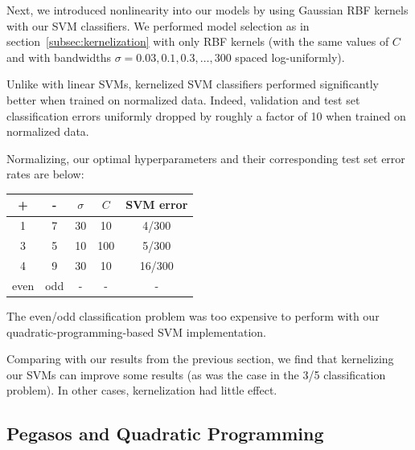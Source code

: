 \documentclass{article}
\begin{document}
\begin{multicols}{2}
Next, we introduced nonlinearity into our models
by using Gaussian RBF kernels with our SVM classifiers.
We performed model selection as in section~\ref{subsec:kernelization}
with only RBF kernels
(with the same values of $C$
and with bandwidths $\sigma = 0.03,0.1,0.3,\dots,300$ spaced log-uniformly).

Unlike with linear SVMs,
kernelized SVM classifiers performed significantly better
when trained on normalized data.
Indeed, validation and test set classification errors
uniformly dropped by roughly a factor of 10
when trained on normalized data.

Normalizing, our optimal hyperparameters
and their corresponding test set error rates are below:
\begin{center}
\begin{tabular}{|c|c||c|c|c|}
\hline
+ & - & $\sigma$ & $C$ & SVM error \\\hline
1 & 7 & 30 & 10 & 4/300 \\
3 & 5 & 10 & 100 & 5/300\\
4 & 9 & 30 & 10 & 16/300\\
even & odd & - & - & - \\\hline
\end{tabular}
\end{center}
The even/odd classification problem was
too expensive to perform
with our quadratic-programming-based SVM implementation.

Comparing with our results from the previous section,
we find that kernelizing our SVMs can improve some results
(as was the case in the 3/5 classification problem).
In other cases, kernelization had little effect.

\subsection{Pegasos and Quadratic Programming}

%
%
%


\end{multicols}
\end{document}
